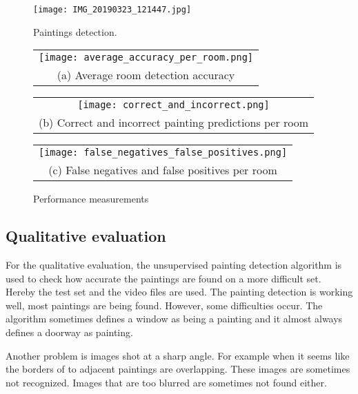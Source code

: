 \begin{figure}[h]
    \texttt{[image: IMG\_20190323\_121447.jpg]}
    \caption{Paintings detection.}
    \label{fig:paiting_detection_with_ground_truth}
\end{figure}

\begin{figure}
    \centering
    \begin{tabular}{@{}c@{}}
        \texttt{[image: average\_accuracy\_per\_room.png]} \\[\abovecaptionskip]
        \small (a) Average room detection accuracy
    \end{tabular}

    \vspace{\floatsep}

    \begin{tabular}{@{}c@{}}
        \texttt{[image: correct\_and\_incorrect.png]} \\[\abovecaptionskip]
        \small (b) Correct and incorrect painting predictions per room
    \end{tabular}

    \begin{tabular}{@{}c@{}}
        \texttt{[image: false\_negatives\_false\_positives.png]} \\[\abovecaptionskip]
        \small (c) False negatives and false positives per room
    \end{tabular}

    \caption{Performance measurements}
    \label{fig:performance-measurements}
\end{figure}

\subsection{Qualitative evaluation}
For the qualitative evaluation, the unsupervised painting detection algorithm is used to check how accurate the paintings are found on a more difficult set. Hereby the test set and the video files are used. The painting detection is working well, most paintings are being found. However, some difficulties occur. The algorithm sometimes defines a window as being a painting and it almost always defines a doorway as painting.

Another problem is images shot at a sharp angle. For example when it seems like the borders of to adjacent paintings are overlapping. These images are sometimes not recognized. Images that are too blurred are sometimes not found either.
